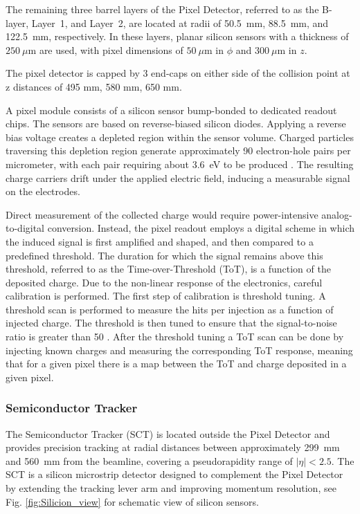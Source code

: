 The remaining three barrel layers of the Pixel Detector, referred to as the B-layer, Layer~1, and Layer~2, are located at radii of 50.5~mm, 88.5~mm, and 122.5~mm, respectively. 
In these layers, planar silicon sensors with a thickness of $250~\mu\text{m}$ are used, with pixel dimensions of $50~\mu\text{m}$ in $\phi$ and $3  00~\mu\text{m}$ in $z$.

The pixel detector is capped by 3 end-caps on either side of the collision point at z distances of 495 mm, 580 mm, 650 mm.


A pixel module consists of a silicon sensor bump-bonded to dedicated readout chips. 
The sensors are based on reverse-biased silicon diodes. 
Applying a reverse bias voltage creates a depleted region within the sensor volume. 
Charged particles traversing this depletion region generate approximately 90 electron-hole pairs per micrometer, with each pair requiring about 3.6~eV to be produced \cite{Particle_Detectors}. 
The resulting charge carriers drift under the applied electric field, inducing a measurable signal on the electrodes.

Direct measurement of the collected charge would require power-intensive analog-to-digital conversion. 
Instead, the pixel readout employs a digital scheme in which the induced signal is first amplified and shaped, and then compared to a predefined threshold. 
The duration for which the signal remains above this threshold, referred to as the Time-over-Threshold (ToT), is a function of the deposited charge. 
Due to the non-linear response of the electronics, careful calibration is performed. 
The first step of calibration is threshold tuning. A threshold scan is performed to measure the hits per injection as a function of injected charge. The threshold is then tuned to ensure that the signal-to-noise ratio is greater than 50 \cite{Stramaglia}.
After the threshold tuning a ToT scan can be done by injecting known charges and measuring the corresponding ToT response, meaning that for a given pixel there is a map between the ToT and charge deposited in a given pixel.
 

\subsubsection{Semiconductor Tracker}

The Semiconductor Tracker (SCT) is located outside the Pixel Detector and provides precision tracking at radial distances between approximately 299~mm and 560~mm from the beamline, covering a pseudorapidity range of $|\eta| < 2.5$. 
The SCT is a silicon microstrip detector designed to complement the Pixel Detector by extending the tracking lever arm and improving momentum resolution, see Fig. \ref{fig:Silicion_view} for schematic view of silicon sensors. 

